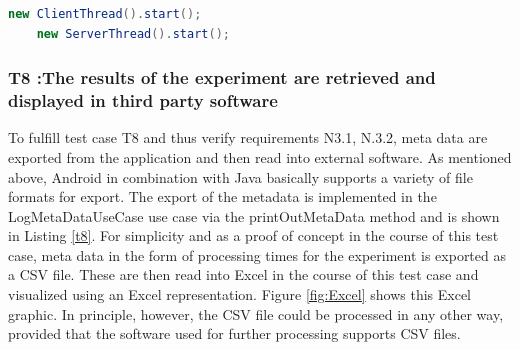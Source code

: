 \begin{lstlisting}[language=java,label=t7c,lineskip={0pt}, caption=Collect time needed to conduct experiment (b), basicstyle=\scriptsize, captionpos=b]
    new ClientThread().start();
    new ServerThread().start();
\end{lstlisting}

\newpage\subsubsection*{T8 :The results of the experiment are retrieved and displayed in third party software}

To fulfill test case T8 and thus verify requirements N3.1, N.3.2, meta data are exported from the application and then read into external software. As mentioned above, Android in combination with Java basically supports a variety of file formats for export. The export of the metadata is implemented in the LogMetaDataUseCase use case via the printOutMetaData method and is shown in Listing \ref{t8}. For simplicity and as a proof of concept in the course of this test case, meta data in the form of processing times for the experiment is exported as a CSV file. These are then read into Excel in the course of this test case and visualized using an Excel representation. Figure \ref{fig:Excel} shows this Excel graphic. In principle, however, the CSV file could be processed in any other way, provided that the software used for further processing supports CSV files. 

\vspace{1cm}


